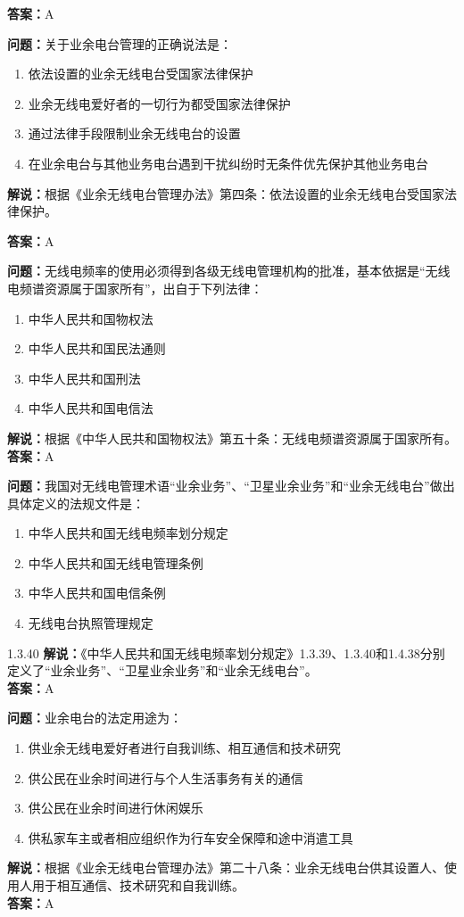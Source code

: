 \textbf{答案：}A

\textbf{问题：}关于业余电台管理的正确说法是：

\begin{enumerate}[label=\Alph*), leftmargin=3em]
	\item 依法设置的业余无线电台受国家法律保护
	\item 业余无线电爱好者的一切行为都受国家法律保护
	\item 通过法律手段限制业余无线电台的设置
	\item 在业余电台与其他业务电台遇到干扰纠纷时无条件优先保护其他业务电台
\end{enumerate}
\textbf{解说：}根据《业余无线电台管理办法》第四条：依法设置的业余无线电台受国家法律保护。

\textbf{答案：}A

\textbf{问题：}无线电频率的使用必须得到各级无线电管理机构的批准，基本依据是“无线电频谱资源属于国家所有”，出自于下列法律：

\begin{enumerate}[label=\Alph*), leftmargin=3em]
	\item 中华人民共和国物权法
	\item 中华人民共和国民法通则
	\item 中华人民共和国刑法
	\item 中华人民共和国电信法
\end{enumerate}
\textbf{解说：}根据《中华人民共和国物权法》第五十条：无线电频谱资源属于国家所有。\\
\textbf{答案：}A

\textbf{问题：}我国对无线电管理术语“业余业务”、“卫星业余业务”和“业余无线电台”做出具体定义的法规文件是：
\begin{enumerate}[label=\Alph*), leftmargin=3em]
	\item 中华人民共和国无线电频率划分规定
	\item 中华人民共和国无线电管理条例
	\item 中华人民共和国电信条例
	\item 无线电台执照管理规定
\end{enumerate}1.3.40
\textbf{解说：}《中华人民共和国无线电频率划分规定》1.3.39、1.3.40和1.4.38分别定义了“业余业务”、“卫星业余业务”和“业余无线电台”。\\
\textbf{答案：}A

\textbf{问题：}业余电台的法定用途为：
\begin{enumerate}[label=\Alph*), leftmargin=3em]
	\item 供业余无线电爱好者进行自我训练、相互通信和技术研究
	\item 供公民在业余时间进行与个人生活事务有关的通信
	\item 供公民在业余时间进行休闲娱乐
	\item 供私家车主或者相应组织作为行车安全保障和途中消遣工具
\end{enumerate}
\textbf{解说：}根据《业余无线电台管理办法》第二十八条：业余无线电台供其设置人、使用人用于相互通信、技术研究和自我训练。\\
\textbf{答案：}A

